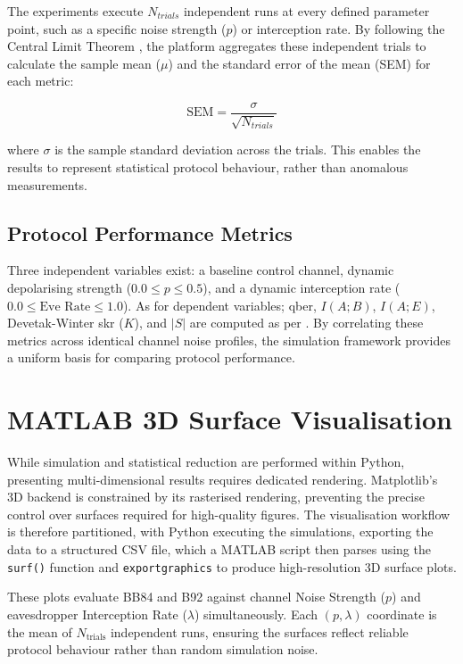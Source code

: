 \documentclass[11pt, a4paper]{report}
\begin{document}
The experiments execute $N_{trials}$ independent runs at every defined parameter point, such as a specific noise strength ($p$) or interception rate. By following the Central Limit Theorem \cite{montgomery2018}, the platform aggregates these independent trials to calculate the sample mean ($\mu$) and the standard error of the mean (SEM) for each metric:

\begin{equation}
\text{SEM} = \frac{\sigma}{\sqrt{N_{trials}}}
\label{eq:sem}
\end{equation}

where $\sigma$ is the sample standard deviation across the trials. This enables the results to represent statistical protocol behaviour, rather than anomalous measurements.

\subsection{Protocol Performance Metrics}
\label{subsec:performance_metrics}

Three independent variables exist: a baseline control channel, dynamic depolarising strength ($0.0 \leq p \leq 0.5$), and a dynamic interception rate ($0.0 \leq \text{Eve Rate} \leq 1.0$). As for dependent variables; \gls{qber}, $I(A;B)$, $I(A;E)$, Devetak-Winter \gls{skr} ($K$), and $|S|$ are computed as per . By correlating these metrics across identical channel noise profiles, the simulation framework provides a uniform basis for comparing protocol performance.


\section{MATLAB 3D Surface Visualisation}
\label{sec:dataviz}

While simulation and statistical reduction are performed within Python, presenting multi-dimensional results requires dedicated rendering. Matplotlib's 3D backend is constrained by its rasterised rendering, preventing the precise control over surfaces required for high-quality figures. The visualisation workflow is therefore partitioned, with Python executing the simulations, exporting the data to a structured CSV file, which a MATLAB script then parses using the \texttt{surf()} function and \texttt{exportgraphics} to produce high-resolution 3D surface plots.

These plots evaluate BB84 and B92 against channel Noise Strength ($p$) and eavesdropper Interception Rate ($\lambda$) simultaneously. Each $(p, \lambda)$ coordinate is the mean of $N_{\text{trials}}$ independent runs, ensuring the surfaces reflect reliable protocol behaviour rather than random simulation noise.
\end{document}
